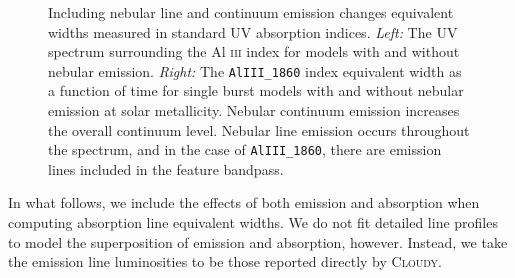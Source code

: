 \documentclass[preprint2]{aastex61}
\newcommand{\Cloudy}{\textsc{Cloudy}\xspace}
\begin{document}
\begin{figure}
  \begin{center}
    \caption{Including nebular line and continuum emission changes equivalent widths measured in standard UV absorption indices. \emph{Left:} The UV spectrum surrounding the Al \textsc{iii} index for models with and without nebular emission. \emph{Right:} The {\tt AlIII\_1860} index equivalent width as a function of time for single burst models with and without nebular emission at solar metallicity. Nebular continuum emission increases the overall continuum level. Nebular line emission occurs throughout the spectrum, and in the case of {\tt AlIII\_1860}, there are emission lines included in the feature bandpass.}
    \label{fig:EWnebular}
  \end{center}
\end{figure}

In what follows, we include the effects of both emission and absorption when computing absorption line equivalent widths. We do not fit detailed line profiles to model the superposition of emission and absorption, however. Instead, we take the emission line luminosities to be those reported directly by \Cloudy.
\end{document}
